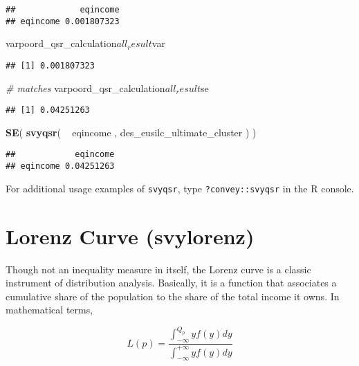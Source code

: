 \documentclass[]{book}
\newenvironment{Shaded}{\begin{snugshade}}{\end{snugshade}}
\newcommand{\KeywordTok}[1]{\textcolor[rgb]{0.13,0.29,0.53}{\textbf{{#1}}}}
\newcommand{\StringTok}[1]{\textcolor[rgb]{0.31,0.60,0.02}{{#1}}}
\newcommand{\CommentTok}[1]{\textcolor[rgb]{0.56,0.35,0.01}{\textit{{#1}}}}
\newcommand{\NormalTok}[1]{{#1}}
\begin{document}
\begin{verbatim}
##             eqincome
## eqincome 0.001807323
\end{verbatim}

\begin{Shaded}
\begin{Highlighting}[]
\NormalTok{varpoord_qsr_calculation$all_result$var}
\end{Highlighting}
\end{Shaded}

\begin{verbatim}
## [1] 0.001807323
\end{verbatim}

\begin{Shaded}
\begin{Highlighting}[]
\CommentTok{# matches}
\NormalTok{varpoord_qsr_calculation$all_result$se}
\end{Highlighting}
\end{Shaded}

\begin{verbatim}
## [1] 0.04251263
\end{verbatim}

\begin{Shaded}
\begin{Highlighting}[]
\KeywordTok{SE}\NormalTok{( }\KeywordTok{svyqsr}\NormalTok{( ~}\StringTok{ }\NormalTok{eqincome , des_eusilc_ultimate_cluster ) )}
\end{Highlighting}
\end{Shaded}

\begin{verbatim}
##            eqincome
## eqincome 0.04251263
\end{verbatim}

For additional usage examples of \texttt{svyqsr}, type
\texttt{?convey::svyqsr} in the R console.

\section{Lorenz Curve (svylorenz)}\label{lorenz-curve-svylorenz}

Though not an inequality measure in itself, the Lorenz curve is a
classic instrument of distribution analysis. Basically, it is a function
that associates a cumulative share of the population to the share of the
total income it owns. In mathematical terms,

\[
L(p) = \frac{\int_{-\infty}^{Q_p}yf(y)dy}{\int_{-\infty}^{+\infty}yf(y)dy}
\]
\end{document}
